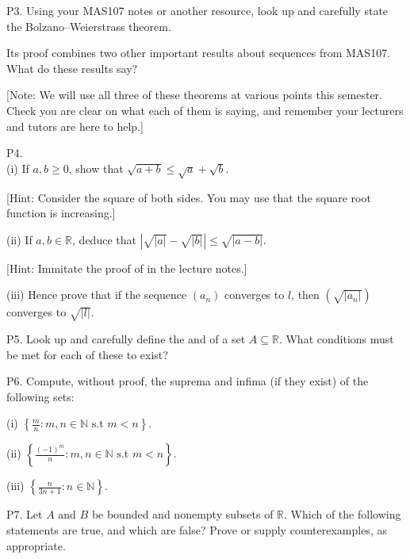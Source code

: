 \documentclass[letterpaper,10pt,english]{jupyterBook}
\begin{document}
\label{\detokenize{Problems:p3}}
\sphinxAtStartPar
P3.  Using your MAS107 notes or another resource, look up and carefully state the Bolzano–Weierstrass theorem.

Its proof combines two other important results about sequences from MAS107. What do these results say?

{[}Note: We will use all three of these theorems at various points this semester. Check you are clear on what each of them is saying, and remember your lecturers and tutors are here to help.{]}


\label{\detokenize{Problems:p4}}
\sphinxAtStartPar
P4.\\
(i) If \(a, b \geq 0\), show that \(\sqrt{a + b} \leq \sqrt{a} + \sqrt{b}\).

{[}Hint: Consider the square of both sides. You may use that the square root function is increasing.{]}

\sphinxAtStartPar
(ii) If \(a,b \in \mathbb{R}\), deduce that \(\left|\sqrt{|a|} - \sqrt{|b|}\right| \leq \sqrt{|a - b|}\).

{[}Hint: Immitate the proof of  in the lecture notes.{]}

\sphinxAtStartPar
(iii) Hence prove that if the sequence \((a_{n})\) converges to \(l\), then \(\left(\sqrt{|a_{n}|}\right)\) converges to \(\sqrt{|l|}\).


\label{\detokenize{Problems:p5}}
\sphinxAtStartPar
P5. Look up and carefully define the  and  of a set \(A\subseteq\mathbb{R}\). What conditions must be met for each of these to exist?


\label{\detokenize{Problems:p6}}
\sphinxAtStartPar
P6. Compute, without proof, the suprema and infima (if they exist) of the following sets:

\sphinxAtStartPar
(i) \(\left\{\frac{m}{n}:m,n\in\mathbb{N} \text{ s.t } m<n\right\}\).

\sphinxAtStartPar
(ii) \(\left\{\frac{(-1)^m}{n}:m,n\in\mathbb{N} \text{ s.t } m<n\right\}\).

\sphinxAtStartPar
(iii) \(\left\{\frac{n}{3n + 1} :n\in\mathbb{N}\right\}\).


\label{\detokenize{Problems:p7}}
\sphinxAtStartPar
P7. Let \(A\) and \(B\) be bounded and non\sphinxhyphen{}empty subsets of \(\mathbb{R}\). Which of the following statements are true, and which are false? Prove or supply counter\sphinxhyphen{}examples, as appropriate.
\end{document}
